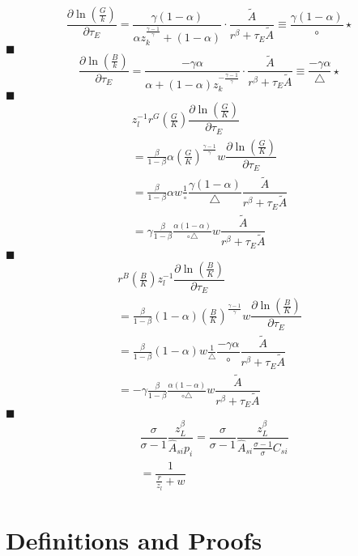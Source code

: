 \documentclass[12pt]{article} %
\begin{document}
\begin{equation*}
        \frac{\partial \ln \left(\frac{G}{k}\right)}{\partial \tau_E}=\frac{\gamma(1-\alpha)}{\alpha z_k^{\frac{\gamma-1}{\gamma}}+(1-\alpha)} \cdot \frac{\tilde{A}}{r^\beta+\tau_E \tilde{A}}	\equiv \frac{\gamma (1-\alpha)}{\circ}\star
\end{equation*}$\blacksquare$
\begin{equation*}
    \frac{\partial \ln \left(\frac{B}{k}\right)}{\partial \tau_E} = \frac{-\gamma\alpha}{\alpha +(1-\alpha)z_k^{-\frac{\gamma-1}{\gamma}}} \cdot \frac{\tilde{A}}{r^\beta+\tau_E \tilde{A}}	\equiv \frac{-\gamma \alpha}{\triangle}\star
\end{equation*}$\blacksquare$
\begin{eqnarray*}
    z_l^{-1}r^G (\frac{G}{K})\dfrac{ \partial \ln (\frac{G}{K}) }{\partial \tau_E} \\
   =\frac{\beta}{1-\beta}{\alpha} (\frac{G}{K})^{\frac{\gamma-1}{\gamma}}{w} \dfrac{ \partial \ln (\frac{G}{K}) }{\partial \tau_E} \\
   =\frac{\beta}{1-\beta}{\alpha}w \frac{1}{\circ}\dfrac{\gamma (1-\alpha)}{\triangle}\dfrac{\tilde{A}}{r^\beta+\tau_E \tilde{A}}\\
   = \gamma \frac{\beta}{1-\beta}\frac{\alpha(1-\alpha)}{\circ\triangle}w\dfrac{\tilde{A}}{r^\beta+\tau_E \tilde{A}} 
\end{eqnarray*}$\blacksquare$	
\begin{eqnarray*}
    r^B (\frac{B}{K})z_l^{-1}\dfrac{ \partial \ln (\frac{B}{K}) }{\partial \tau_E} \\
    = \frac{\beta}{1-\beta}{(1-\alpha)}(\frac{B}{K})^{\frac{\gamma-1}{\gamma}}w \dfrac{ \partial \ln (\frac{B}{K}) }{\partial \tau_E} \\ 
    = \frac{\beta}{1-\beta}{(1-\alpha)}w  \frac{1}{\triangle}\dfrac{-\gamma \alpha}{\circ}\dfrac{\tilde{A}}{r^\beta+\tau_E \tilde{A}}\\
    = -\gamma \frac{\beta}{1-\beta}\frac{\alpha(1-\alpha)}{\circ\triangle}w\dfrac{\tilde{A}}{r^\beta+\tau_E \tilde{A}}
\end{eqnarray*} $\blacksquare$
\begin{eqnarray*}
    &\dfrac{\sigma}{\sigma -1}\dfrac{z_L^{\beta}}{{\hat{A}_{si}}p_i} = \dfrac{\sigma}{\sigma -1} \dfrac{z_L^{\beta}}{\hat{A}_{si}\frac{\sigma -1}{\sigma} C_{si}}\\
    & = \dfrac{1}{\frac{r}{z_l} + w}
\end{eqnarray*}

\section{Definitions and Proofs} 
\end{document}
